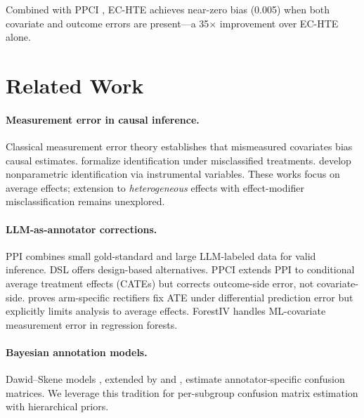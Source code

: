 \documentclass[11pt,twocolumn]{article}
\begin{document}
\noindent Combined with PPCI \citep{sui2026prediction}, EC-HTE achieves near-zero bias (0.005) when both covariate and outcome errors are present---a 35$\times$ improvement over EC-HTE alone.

\section{Related Work}

\paragraph{Measurement error in causal inference.}
Classical measurement error theory \citep{fuller1987measurement, carroll2006measurement, gustafson2003measurement} establishes that mismeasured covariates bias causal estimates. \citet{imai2010causal} formalize identification under misclassified treatments. \citet{hu2008instrumental} develop nonparametric identification via instrumental variables. These works focus on average effects; extension to \emph{heterogeneous} effects with effect-modifier misclassification remains unexplored.

\paragraph{LLM-as-annotator corrections.}
PPI \citep{angelopoulos2023prediction} combines small gold-standard and large LLM-labeled data for valid inference. DSL \citep{egami2024using} offers design-based alternatives. PPCI \citep{sui2026prediction} extends PPI to conditional average treatment effects (CATEs) but corrects outcome-side error, not covariate-side. \citet{mozer2026adjusting} proves arm-specific rectifiers fix ATE under differential prediction error but explicitly limits analysis to average effects. ForestIV \citep{bu2023treatment} handles ML-covariate measurement error in regression forests.

\paragraph{Bayesian annotation models.}
Dawid--Skene models \citep{dawid1979maximum}, extended by \citet{passonneau2014benefits} and \citet{hovy2013learning}, estimate annotator-specific confusion matrices. We leverage this tradition for per-subgroup confusion matrix estimation with hierarchical priors.
\end{document}
